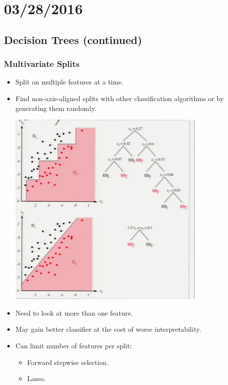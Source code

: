 \documentclass[10pt]{article}
\begin{document}
\section*{03/28/2016}

\subsection*{Decision Trees (continued)}

\subsubsection*{Multivariate Splits}
	\begin{itemize}
		\item Split on multiple features at a time.
			\item Find non-axis-aligned splits with other classification algorithms or by generating them randomly.
			\begin{center}
				\includegraphics[scale=0.5]{../images/multivariatedecisiontree}
			\end{center}
			\item Need to look at more than one feature.
			\item May gain better classifier at the cost of worse interpretability.
			\item Can limit number of features per split:
				\begin{itemize}
					\item Forward stepwise selection.
					\item Lasso.
				\end{itemize}
	\end{itemize}
\end{document}
